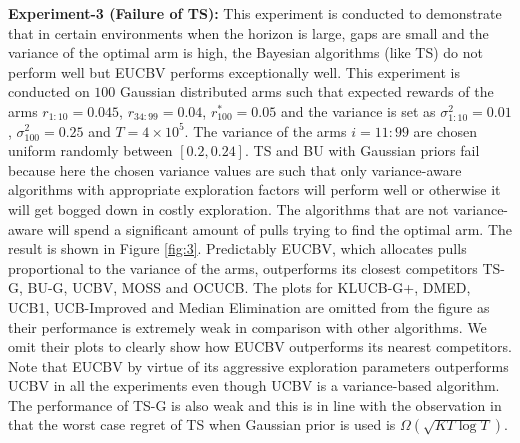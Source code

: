 
\textbf{Experiment-3 (Failure of TS):} This experiment is conducted to demonstrate that in certain environments when the horizon is large, gaps are small and the variance of the optimal arm is high, the Bayesian algorithms (like TS) do not perform well but EUCBV performs exceptionally well. This experiment is conducted on $100$ Gaussian distributed arms such that expected rewards of the arms $r_{1:10}=0.045$, $r_{34:99}=0.04$, $r^{*}_{100}=0.05$ and the variance is set as $\sigma_{1:10}^{2}=0.01$,   $\sigma_{100}^{2}=0.25$ and $T=4\times 10^5$. The variance of the arms $i=11:99$ are chosen uniform randomly between $[0.2,0.24]$. TS and BU with Gaussian priors fail because here the chosen variance values are such that only variance-aware algorithms with appropriate exploration factors will perform  well or otherwise it will get bogged down in costly exploration. The algorithms that are not variance-aware will spend a significant amount of pulls trying to find the optimal arm. The result is shown in Figure \ref{fig:3}. Predictably EUCBV, which allocates pulls proportional to the variance of the arms, outperforms its closest competitors TS-G, BU-G, UCBV, MOSS and OCUCB. The plots for KLUCB-G+, DMED, UCB1, UCB-Improved and Median Elimination are omitted from the figure as their performance is extremely weak in comparison with other algorithms. We omit their plots to clearly show how EUCBV outperforms its nearest competitors. Note that EUCBV by virtue of its aggressive exploration parameters outperforms UCBV in all the experiments even though UCBV is a variance-based algorithm. The performance of TS-G is also weak and this is in line with the observation in \citet{lattimore2015optimally} that the worst case regret of TS when Gaussian prior is used is $\Omega\left( \sqrt{KT\log T}\right)$.



